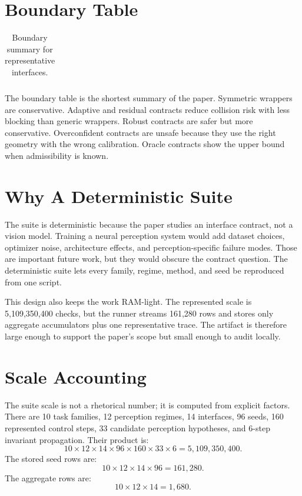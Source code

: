 \documentclass{article}
\newcommand{\fullscale}{5,109,350,400}
\newcommand{\seedrows}{161,280}
\newcommand{\aggrows}{1,680}
\begin{document}
\section{Boundary Table}

\begin{table}[h]
\centering
\small
\caption{Boundary summary for representative interfaces.}
\label{tab:boundary}
\begin{tabular}{lrrr}
\toprule

\end{tabular}
\end{table}

The boundary table is the shortest summary of the paper. Symmetric wrappers are conservative. Adaptive and residual contracts reduce collision risk with less blocking than generic wrappers. Robust contracts are safer but more conservative. Overconfident contracts are unsafe because they use the right geometry with the wrong calibration. Oracle contracts show the upper bound when admissibility is known.

\section{Why A Deterministic Suite}

The suite is deterministic because the paper studies an interface contract, not a vision model. Training a neural perception system would add dataset choices, optimizer noise, architecture effects, and perception-specific failure modes. Those are important future work, but they would obscure the contract question. The deterministic suite lets every family, regime, method, and seed be reproduced from one script.

This design also keeps the work RAM-light. The represented scale is \fullscale{} checks, but the runner streams \seedrows{} rows and stores only aggregate accumulators plus one representative trace. The artifact is therefore large enough to support the paper's scope but small enough to audit locally.

\section{Scale Accounting}

The suite scale is not a rhetorical number; it is computed from explicit factors. There are 10 task families, 12 perception regimes, 14 interfaces, 96 seeds, 160 represented control steps, 33 candidate perception hypotheses, and 6-step invariant propagation. Their product is:
\begin{equation}
    10\times 12\times 14\times 96\times 160\times 33\times 6
    =
    \fullscale{}.
\end{equation}
The stored seed rows are:
\begin{equation}
    10\times 12\times 14\times 96
    =
    \seedrows{}.
\end{equation}
The aggregate rows are:
\begin{equation}
    10\times 12\times 14
    =
    \aggrows{}.
\end{equation}
\end{document}

